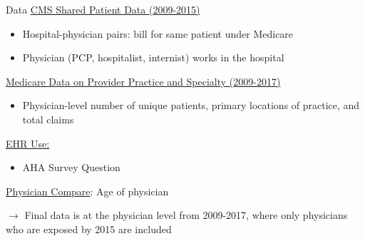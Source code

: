 \documentclass[10pt]{beamer}
\begin{document}
\begin{frame}{Data}
    \underline{CMS Shared Patient Data (2009-2015)}
    \begin{itemize}
        \item Hospital-physician pairs: bill for same patient under Medicare
        \item Physician (PCP, hospitalist, internist) works in the hospital
    \end{itemize}
    
    \vspace{3mm}
    
    \underline{Medicare Data on Provider Practice and Specialty (2009-2017)}
    \begin{itemize}
        \item Physician-level number of unique patients, primary locations of practice, and total claims 
    \end{itemize}
    
    \vspace{3mm}
    
    \underline{EHR Use:}
    \begin{itemize}
        \item AHA Survey Question
    \end{itemize}
    
    \vspace{3mm}
    
    \underline{Physician Compare}: Age of physician
    
    \vspace{3mm}
    
    $\rightarrow$ Final data is at the physician level from 2009-2017, where only physicians who are exposed by 2015 are included 
\end{frame}
\end{document}
